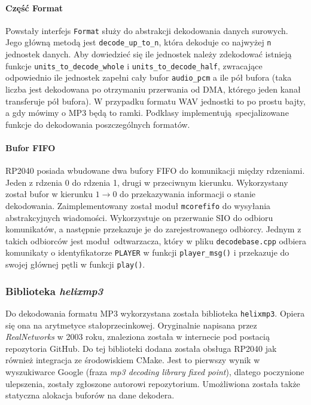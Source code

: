 \documentclass[polish]{aghengthesis}
\begin{document}
			\paragraph{Część Format}
				Powstały interfejs \lstinline|Format| służy do abstrakcji dekodowania danych surowych. Jego główną metodą jest \lstinline|decode_up_to_n|, która dekoduje co najwyżej \lstinline|n| jednostek danych. Aby dowiedzieć się ile jednostek należy zdekodować istnieją funkcje \lstinline|units_to_decode_whole| i \lstinline|units_to_decode_half|, zwracające odpowiednio ile jednostek zapełni cały bufor \lstinline|audio_pcm| a ile pół bufora (taka liczba jest dekodowana po otrzymaniu przerwania od DMA, którego jeden kanał transferuje pół bufora). W przypadku formatu WAV jednostki to po prostu bajty, a gdy mówimy o MP3 będą to ramki. Podklasy implementują specjalizowane funkcje do dekodowania poszczególnych formatów.
			
			\paragraph{Bufor FIFO}
				RP2040 posiada wbudowane dwa bufory FIFO do komunikacji między rdzeniami. Jeden z rdzenia 0 do rdzenia 1, drugi w przeciwnym kierunku. Wykorzystany został bufor w kierunku $1 \rightarrow 0$ do przekazywania informacji o stanie dekodowania. Zaimplementowany został moduł \lstinline|mcorefifo| do wysyłania abstrakcyjnych wiadomości. Wykorzystuje on przerwanie SIO do odbioru komunikatów, a następnie przekazuje je do zarejestrowanego odbiorcy. Jednym z takich odbiorców jest moduł odtwarzacza, który w pliku \lstinline|decodebase.cpp| odbiera komunikaty o identyfikatorze \lstinline|PLAYER| w funkcji \lstinline|player_msg()| i przekazuje do swojej głównej pętli w funkcji \lstinline|play()|.
		
		\subsubsection{Biblioteka \textit{helixmp3}}
			Do dekodowania formatu MP3 wykorzystana została biblioteka \lstinline|helixmp3|. Opiera się ona na arytmetyce stałoprzecinkowej. Oryginalnie napisana przez \textit{RealNetworks}\textsuperscript{\cite{realnetworks}} w 2003 roku, znaleziona została w internecie pod postacią repozytoria GitHub\textsuperscript{\cite{helixmp3_repo}}. Do tej biblioteki dodana została obsługa RP2040 jak również integracja ze środowiskiem CMake. Jest to pierwszy wynik w wyszukiwarce Google (fraza \textit{mp3 decoding library fixed point}), dlatego poczynione ulepszenia, zostały zgłoszone autorowi repozytorium\textsuperscript{\cite{helixmp3_pr}}. Umożliwiona została także statyczna alokacja buforów na dane dekodera.
			
\end{document}
